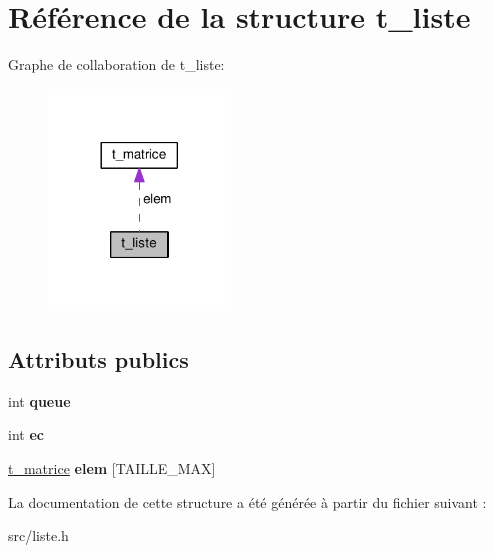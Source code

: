 \hypertarget{structt__liste}{}\section{Référence de la structure t\+\_\+liste}
\label{structt__liste}


Graphe de collaboration de t\+\_\+liste\+:
\nopagebreak
\begin{figure}[H]
\begin{center}
\leavevmode
\includegraphics[width=137pt]{structt__liste__coll__graph}
\end{center}
\end{figure}
\subsection*{Attributs publics}
\begin{DoxyCompactItemize}
\item 
int {\bfseries queue}\hypertarget{structt__liste_a4490eb6055dcac86850cb786fb82bde1}{}\label{structt__liste_a4490eb6055dcac86850cb786fb82bde1}

\item 
int {\bfseries ec}\hypertarget{structt__liste_a29d2b9847ad3ab87a33e5d1f6a1452d3}{}\label{structt__liste_a29d2b9847ad3ab87a33e5d1f6a1452d3}

\item 
\hyperlink{structt__matrice}{t\+\_\+matrice} {\bfseries elem} \mbox{[}T\+A\+I\+L\+L\+E\+\_\+\+M\+AX\mbox{]}\hypertarget{structt__liste_af85442e24b947c7ebbf2aeadf6f8c20c}{}\label{structt__liste_af85442e24b947c7ebbf2aeadf6f8c20c}

\end{DoxyCompactItemize}


La documentation de cette structure a été générée à partir du fichier suivant \+:\begin{DoxyCompactItemize}
\item 
src/liste.\+h\end{DoxyCompactItemize}
